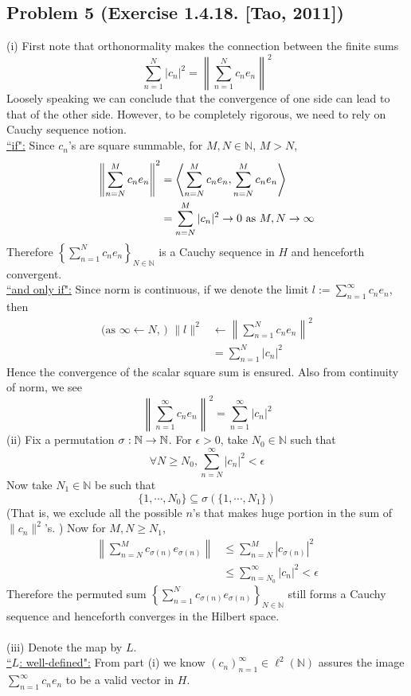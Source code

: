 \documentclass[12pt,a4paper]{article}
\newcommand{\ra}[1]{\ifnum #1=1\rightarrow\fi\ifnum #1=2\Rightarrow\fi}
\newcommand{\claim}[1]{\underline{``{#1}":}}
\newcommand{\bga}{\begin{align*}}
\renewcommand{\l}{\left}\renewcommand{\r}{\right}
\newcommand{\SUM}[2]{\sum\limits_{#1}^{#2}}
\newcommand{\N}{\mathbb N}%
\begin{document}
\newpage\subsection*{Problem 5 (Exercise 1.4.18. [Tao, 2011])}
(i) First note that orthonormality makes the connection between the finite sums
$$\SUM{n=1}N |c_n|^2 = \l\|\SUM{n=1}N c_ne_n\r\|^2$$
Loosely speaking we can conclude that the convergence of one side can lead to that of the other side. However, to be completely rigorous, we need to rely on Cauchy sequence notion. \\
\claim{if} Since $c_n$'s are square summable, for $M, N \in \N$, $M>N$, 
\bga
\l\|\SUM{n=N}M c_n e_n \r\|^2 & = \l\langle \SUM{n=N}M c_n e_n , \SUM{n=N}M c_n e_n \r\rangle\\
& = \SUM{n=N}M |c_n|^2 \ra1 0 \text{ as } M, N \ra1\infty
\end{align*}
Therefore $\l\{\SUM{n=1}N c_ne_n\r\}_{N\in\N}$ is a Cauchy sequence in $H$ and henceforth convergent. \\
\claim{and only if} Since norm is continuous, if we denote the limit $l := \SUM{n=1}\infty c_ne_n$, then
\bga
\text{(as } \infty  \leftarrow N\text{, ) }  \|l\|^2 & \leftarrow \l\|\SUM{n=1}N c_ne_n\r\|^2 \\
& = \SUM{n=1}N |c_n|^2
\end{align*}
Hence the convergence of the scalar square sum is ensured. Also from continuity of norm, we see 
$$\l\|\SUM{n=1}\infty c_n e_n\r\|^2 = \SUM{n=1}\infty |c_n|^2$$
(ii) Fix a permutation $\sigma: \N \ra1 \N$. For $\epsilon >0$, take $N_0\in\N$ such that
$$\forall N \geq N_0, \SUM{n=N}\infty |c_n|^2 < \epsilon$$
Now take $N_1 \in \N$ be such that 
$$\{1, \cdots, N_0\} \subseteq \sigma\l(\{1, \cdots, N_1\}\r)$$
(That is, we exclude all the possible $n$'s that makes huge portion in the sum of $\|c_n\|^2$'s. ) Now for $M, N \geq N_1$, 
\bga
\l\|\SUM{n=N}{M} c_{\sigma(n)} e_{\sigma(n)}\r\|
& \leq \SUM{n=N}{M} |c_{\sigma(n)}|^2 \\
& \leq \SUM{n=N_0}\infty |c_n|^2 < \epsilon
\end{align*}
Therefore the permuted sum $\l\{\SUM{n=1}N c_{\sigma(n)} e_{\sigma(n)}\r\}_{N\in\N}$ still forms a Cauchy sequence and henceforth converges in the Hilbert space. \\
\\
(iii) Denote the map by $L$. \\
\claim{$L$: well-defined} From part (i) we know $(c_n)_{n=1}^\infty \in \ell^2(\N)$ assures the image $\SUM{n=1}\infty c_n e_n$ to be a valid vector in $H$. \\
\end{document}
